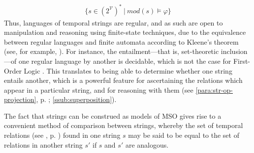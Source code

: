\documentclass[a4paper,12pt,leqno,twoside]{article}
\newcommand{\V}{\mathcal{V}}
\renewcommand{\phi}{\varphi}
\newcommand{\nb}[1]{{\color{red}[NB\footnote{{\color{red}#1}}]}}
\begin{document}
\begin{align}\label{def:mso-regularity}
	\{s \in (2^{\V})^* ~|~ mod(s) \models \phi \}
\end{align}
Thus, languages of temporal strings are regular, and as such are open to manipulation and reasoning using finite-state techniques, due to the equivalence between regular languages and finite automata according to Kleene's theorem (see, for example, \citet[p. 41]{yu1997regular}). For instance, the entailment---that is, set-theoretic inclusion---of one regular language by another is decidable, which is not the case for First-Order Logic \citep{trakhtenbrot1953recursive,elgot1966decidability}. This translates to being able to determine whether one string entails another, which is a powerful feature for ascertaining the relations which appear in a particular string, and for reasoning with them (see \cref{para:str-op-projection}, p. \pageref{para:str-op-projection}; \cref{ssub:superposition}).

The fact that strings can be construed as models of MSO gives rise to a convenient method of comparison between strings, whereby the set of temporal relations (see , p. \pageref{tab:allen-rels-strings}) found in one string $s$ may be said to be equal to the set of relations in another string $s'$ if $s$ and $s'$ are analogous.
\end{document}
